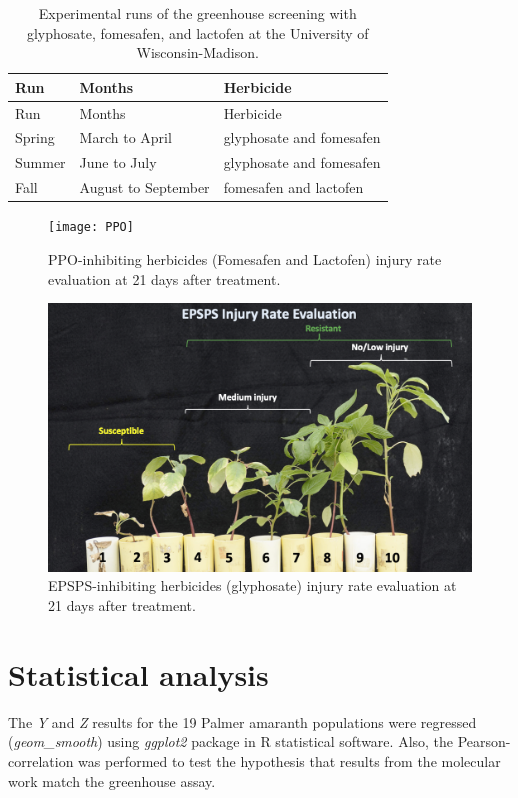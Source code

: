\documentclass[]{article}
\begin{document}
\begin{longtable}[]{@{}lll@{}}
\caption{Experimental runs of the greenhouse screening with glyphosate,
fomesafen, and lactofen at the University of
Wisconsin-Madison.}\tabularnewline
\toprule
Run & Months & Herbicide\tabularnewline
\midrule
\endfirsthead
\toprule
Run & Months & Herbicide\tabularnewline
\midrule
\endhead
Spring & March to April & glyphosate and fomesafen\tabularnewline
Summer & June to July & glyphosate and fomesafen\tabularnewline
Fall & August to September & fomesafen and lactofen\tabularnewline
\bottomrule
\end{longtable}

\begin{figure}[h]

{\centering \texttt{[image: PPO]} 

}

\caption{PPO-inhibiting herbicides (Fomesafen and Lactofen) injury rate evaluation at 21 days after treatment.}\label{fig:unnamed-chunk-2}
\end{figure}

\begin{figure}[h]

{\centering \includegraphics[width=0.8\linewidth]{EPSPS} 

}

\caption{EPSPS-inhibiting herbicides (glyphosate) injury rate evaluation at 21 days after treatment.}\label{fig:unnamed-chunk-3}
\end{figure}

\section{Statistical analysis}\label{statistical-analysis}

The \emph{Y} and \emph{Z} results for the 19 Palmer amaranth populations
were regressed (\emph{geom\_smooth}) using \emph{ggplot2} package in R
statistical software. Also, the Pearson-correlation was performed to
test the hypothesis that results from the molecular work match the
greenhouse assay.
\end{document}
